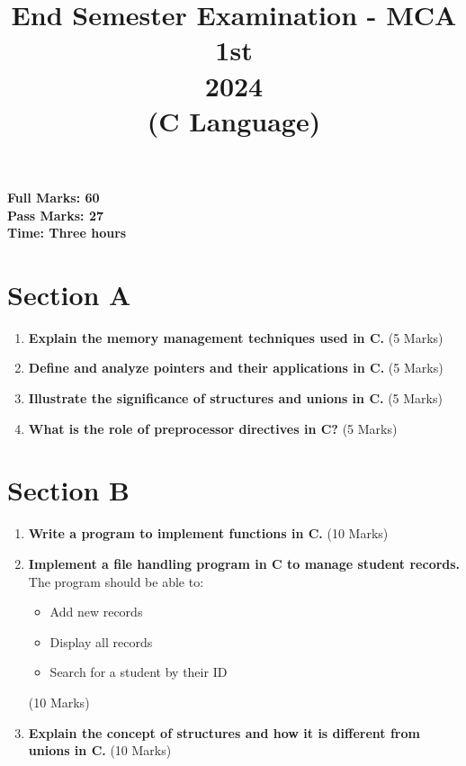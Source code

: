 \documentclass[a4paper,12pt]{article}
\title{\textbf{End Semester Examination - MCA 1st \\ 2024 \\ (C Language)}}
\begin{document}
\maketitle
\begin{center}
\textbf{Full Marks: 60 \\ Pass Marks: 27 \\ Time: Three hours}
\end{center}

\vspace{10pt}
\section*{\centering Section A}

\begin{enumerate}[label=\textbf{Q\arabic*.}]
    \item \textbf{Explain the memory management techniques used in C.} \hfill (5 Marks)
    
    \item \textbf{Define and analyze pointers and their applications in C.} \hfill (5 Marks)
    
    \item \textbf{Illustrate the significance of structures and unions in C.} \hfill (5 Marks)
    
    \item \textbf{What is the role of preprocessor directives in C?} \hfill (5 Marks)
\end{enumerate}

\vspace{10pt}

\section*{\centering Section B}

\begin{enumerate}[label=\textbf{Q\arabic*.}, start=5]
    
    \item \textbf{Write a program to implement functions in C.} \hfill (10 Marks)
    
    \item \textbf{Implement a file handling program in C to manage student records.} The program should be able to:
    \begin{itemize}
        \item Add new records
        \item Display all records
        \item Search for a student by their ID
    \end{itemize}
    \hfill (10 Marks)
    
    \item \textbf{Explain the concept of structures and how it is different from unions in C.} \hfill (10 Marks)
\end{enumerate}
\end{document}
